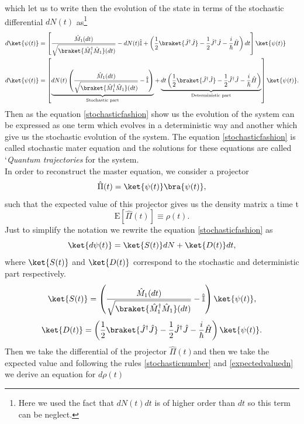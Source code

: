 which let us to write then the evolution of the state in terms of the stochastic differential $dN(t)$ as\footnote{Here we used the fact that $dN(t)dt$ is of higher order than $dt$ so this term can be neglect.}
\begin{align}
d\ket{\psi(t)}&=\left[\frac{\hat{M}_{1}(dt)}{\sqrt{\braket{\hat{M}_{1}^{\dagger}\hat{M}_{1}}(dt)}}-dN(t)\hat{\mathbb{I}}+\left(\frac{1}{2}\braket{\hat{J}^{\dagger}\hat{J}}-\frac{1}{2}\hat{J}^{\dagger}\hat{J}-\frac{i}{\hbar}\hat{H}\right)dt\right]\ket{\psi(t)}\nonumber\\
d\ket{\psi(t)}&=\left[\underbrace{dN(t)\left(\frac{\hat{M}_{1}(dt)}{\sqrt{\braket{\hat{M}_{1}^{\dagger}\hat{M}_{1}}(dt)}}-\hat{\mathbb{I}}\right)}_{\text{Stochastic part}}+\underbrace{dt\left(\frac{1}{2}\braket{\hat{J}^{\dagger}\hat{J}}-\frac{1}{2}\hat{J}^{\dagger}\hat{J}-\frac{i}{\hbar}\hat{H}\right)}_{\text{Deterministic part}}\right]\ket{\psi(t)}. 
\label{stochasticfashion}
\end{align}
Then as the equation \eqref{stochasticfashion} show us the evolution of the system can be expressed as one term which evolves in a deterministic way and another which give us the stochastic evolution of the system. The equation \eqref{stochasticfashion} is called stochastic mater equation and the solutions for these equations are called `\textit{Quantum trajectories} for the system.\\
In order to reconstruct the master equation, we consider a projector 
\[\hat{\Pi}(t)=\ket{\psi(t)}\bra{\psi(t)},\]
such that the expected value of this projector gives us the density matrix a time t
\begin{equation}
\text{E}[\hat{\Pi}(t)]\equiv\rho(t).
\label{projector}
\end{equation}
Just to simplify the notation we rewrite the equation \ref{stochasticfashion} as
\begin{equation}
\ket{d\psi(t)}=\ket{S(t)}dN+\ket{D(t)}dt,
\label{trajectory6}
\end{equation}
where $\ket{S(t)}$ and $\ket{D(t)}$ correspond to the stochastic and deterministic part respectively.
\[\ket{S(t)}=\left(\frac{\hat{M}_{1}(dt)}{\sqrt{\braket{\hat{M}_{1}^{\dagger}\hat{M}_{1}}(dt)}}-\hat{\mathbb{I}}\right)\ket{\psi(t)},\]
\[\ket{D(t)}=\left(\frac{1}{2}\braket{\hat{J}^{\dagger}\hat{J}}-\frac{1}{2}\hat{J}^{\dagger}\hat{J}-\frac{i}{\hbar}\hat{H}\right)\ket{\psi(t)}.\]
Then we take the differential of the projector $\hat{\Pi}(t)$and then we take the expected value and following the rules  \eqref{stochasticnumber} and \eqref{expectedvaluedn}  we derive an equation for $d\rho(t)$
